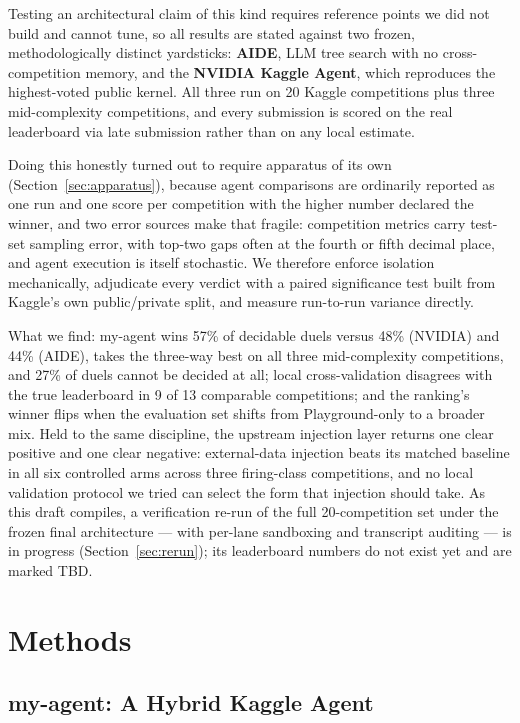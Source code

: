 \documentclass[11pt,a4paper]{article}
\begin{document}
Testing an architectural claim of this kind requires reference points we did not build and cannot tune, so all results are stated against two frozen, methodologically distinct yardsticks: \textbf{AIDE}, LLM tree search with no cross-competition memory, and the \textbf{NVIDIA Kaggle Agent}, which reproduces the highest-voted public kernel. All three run on 20 Kaggle competitions plus three mid-complexity competitions, and every submission is scored on the real leaderboard via late submission rather than on any local estimate.

Doing this honestly turned out to require apparatus of its own (Section~\ref{sec:apparatus}), because agent comparisons are ordinarily reported as one run and one score per competition with the higher number declared the winner, and two error sources make that fragile: competition metrics carry test-set sampling error, with top-two gaps often at the fourth or fifth decimal place, and agent execution is itself stochastic. We therefore enforce isolation mechanically, adjudicate every verdict with a paired significance test built from Kaggle's own public/private split, and measure run-to-run variance directly. 

What we find: my-agent wins 57\% of decidable duels versus 48\% (NVIDIA) and 44\% (AIDE), takes the three-way best on all three mid-complexity competitions, and 27\% of duels cannot be decided at all; local cross-validation disagrees with the true leaderboard in 9 of 13 comparable competitions; and the ranking's winner flips when the evaluation set shifts from Playground-only to a broader mix. Held to the same discipline, the upstream injection layer returns one clear positive and one clear negative: external-data injection beats its matched baseline in all six controlled arms across three firing-class competitions, and no local validation protocol we tried can select the form that injection should take. As this draft compiles, a verification re-run of the full 20-competition set under the frozen final architecture --- with per-lane sandboxing and transcript auditing --- is in progress (Section~\ref{sec:rerun}); its leaderboard numbers do not exist yet and are marked TBD.

\section{Methods}

\subsection{my-agent: A Hybrid Kaggle Agent}
\end{document}
